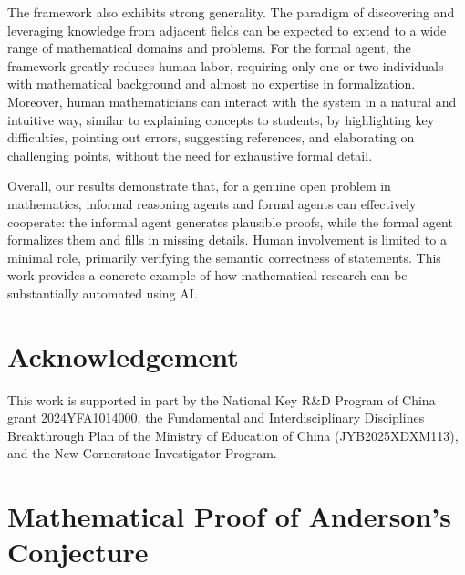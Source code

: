 \documentclass[]{pkuai4m}
\theoremstyle{plain}
\theoremstyle{definition}
\begin{document}
The framework also exhibits strong generality. The paradigm of discovering and leveraging knowledge from adjacent fields can be expected to extend to a wide range of mathematical domains and problems. For the formal agent, the framework greatly reduces human labor, requiring only one or two individuals with mathematical background and almost no expertise in formalization. Moreover, human mathematicians can interact with the system in a natural and intuitive way, similar to explaining concepts to students, by highlighting key difficulties, pointing out errors, suggesting references, and elaborating on challenging points, without the need for exhaustive formal detail.


Overall, our results demonstrate that, for a genuine open problem in mathematics, informal reasoning agents and formal agents can effectively cooperate: the informal agent generates plausible proofs, while the formal agent formalizes them and fills in missing details. Human involvement is limited to a minimal role, primarily verifying the semantic correctness of statements. This work provides a concrete example of how mathematical research can be substantially automated using AI.




\section*{Acknowledgement}
This work is supported in part by the National Key R\&D Program of China grant 2024YFA1014000, the Fundamental and Interdisciplinary Disciplines Breakthrough Plan of the Ministry of Education of China (JYB2025XDXM113), and the New Cornerstone Investigator Program.










\clearpage




\clearpage

\beginappendix


\section{Mathematical Proof of Anderson's Conjecture}\label{app:math_proof}
\end{document}
